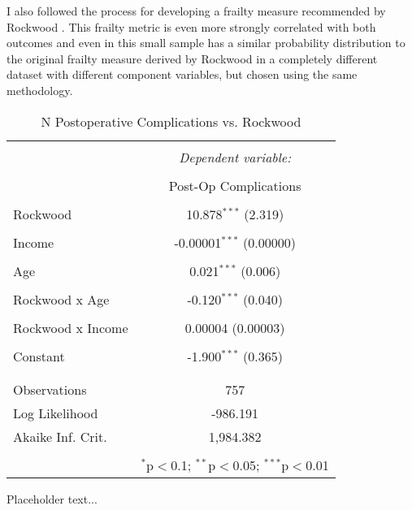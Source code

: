 
I also followed the process for developing a frailty measure recommended by Rockwood \cite{Rockwood_2005}. This frailty metric is even more strongly correlated with both outcomes and even in this small sample has a similar probability distribution to the original frailty measure derived by Rockwood \cite{Mitnitski_2001} in a completely different dataset with different component variables, but chosen using the same methodology.

\begin{table}\centering 
  \caption{ N Postoperative Complications vs. Rockwood }\label{wrap-tab:4} 
\begin{tabular}{@{\extracolsep{5pt}}lc} 
\\[-1.8ex]\hline 
\hline \\[-1.8ex] 
 & \multicolumn{1}{c}{\textit{Dependent variable:}} \\ 
\cline{2-2} 
\\[-1.8ex] & {Post-Op Complications} \\ 
\hline \\[-1.8ex] 
 Rockwood & 10.878$^{***}$ (2.319) \\ 
  & \\ 
 Income & -0.00001$^{***}$ (0.00000) \\ 
  & \\ 
 Age & 0.021$^{***}$ (0.006) \\ 
  & \\ 
 Rockwood x Age & -0.120$^{***}$ (0.040) \\ 
  & \\ 
 Rockwood x Income & 0.00004 (0.00003) \\ 
  & \\ 
 Constant & -1.900$^{***}$ (0.365) \\ 
  & \\ 
\hline \\[-1.8ex] 
Observations & \multicolumn{1}{c}{757} \\ 
Log Likelihood & \multicolumn{1}{c}{-986.191} \\ 
Akaike Inf. Crit. & \multicolumn{1}{c}{1,984.382} \\ 
\hline 
\hline \\[-1.8ex] 
  & \multicolumn{1}{r}{$^{*}$p$<$0.1; $^{**}$p$<$0.05; $^{***}$p$<$0.01} \\ 
\end{tabular} 
\end{table} 

Placeholder text...


